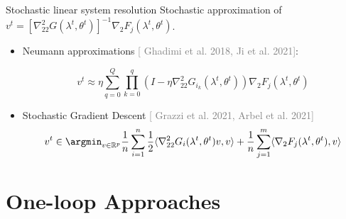 \documentclass{beamer}
\newcommand{\citeline}[1]{\textcolor{gray}{\small[{\color{linkcolor} #1}]}}
\begin{document}
\begin{frame}{Stochastic linear system resolution}
    Stochastic approximation of $v^t = \left[\nabla^2_{22} G(\lambda^t, \theta^t)\right]^{-1}\nabla_2 F_j(\lambda^t, \theta^t)$.

    \vspace{.5cm}
    \begin{itemize}[<+->]
        \item Neumann approximations \citeline{Ghadimi et al. 2018, Ji et al. 2021}:

        $$
        v^t
        \approx
        \eta\sum_{q=0}^{Q
        }
        \prod_{k=0}^q\left(I - \eta\nabla^2_{22}G_{i_k}(\lambda^t, \theta^t)\right)\nabla_2 F_j (\lambda^t, \theta^t)
        $$


        \vspace{.3cm}
        \item Stochastic Gradient Descent \citeline{Grazzi et al. 2021, Arbel et al. 2021}
        $$v^t \in \argmin_{v\in\mathbb R^p} \frac1n\sum_{i=1}^n\frac12\langle \nabla^2_{22} G_i(\lambda^t, \theta^t)v, v\rangle + \frac1n\sum_{j=1}^m\langle \nabla_2 F_j(\lambda^t, \theta^t), v\rangle$$
    \end{itemize}

    \pause
\end{frame}


\section{One-loop Approaches}



\end{document}
